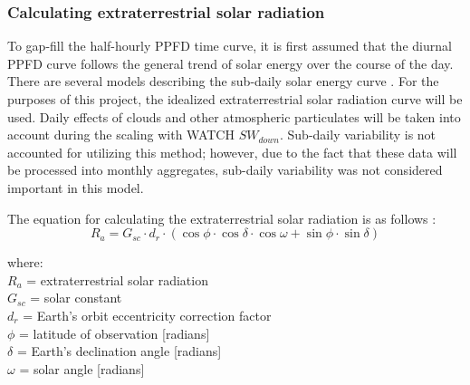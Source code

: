\subsubsection{Calculating extraterrestrial solar radiation}
\label{sec:mst2etsr}
To gap-fill the half-hourly PPFD time curve, it is first assumed that the diurnal PPFD curve follows the general trend of solar energy over the course of the day. 
There are several models describing the sub-daily solar energy curve \parencite{ahmad11}.  
For the purposes of this project, the idealized extraterrestrial solar radiation curve will be used.  
Daily effects of clouds and other atmospheric particulates will be taken into account during the scaling with WATCH $SW_{down}$.  
Sub-daily variability is not accounted for utilizing this method; however, due to the fact that these data will be processed into monthly aggregates, sub-daily variability was not considered important in this model. 

The equation for calculating the extraterrestrial solar radiation is as follows \parencite[Eq.~1.10.2]{duffie13}:
%
%
%
%
%
\begin{equation}
\label{eq:etsr}
    R_{a} = G_{sc} \cdot d_{r} \cdot \left(\cos \phi \cdot \cos \delta \cdot \cos \omega + \sin \phi \cdot \sin \delta\right)
\end{equation}

\noindent where: \\
\indent $R_{a}$ = extraterrestrial solar radiation \\
\indent $G_{sc}$ = solar constant \\
\indent $d_{r}$ = Earth's orbit eccentricity correction factor \\
\indent $\phi$ = latitude of observation [radians]\\
\indent $\delta$ = Earth's declination angle [radians] \\
\indent $\omega$ = solar angle [radians] \\

